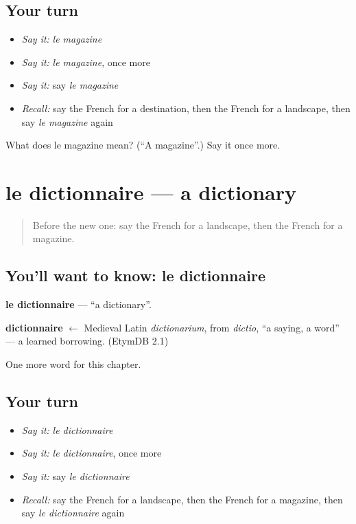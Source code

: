\subsection*{Your turn}
\begin{itemize}
\raggedright
  \item \emph{Say it:} \emph{le magazine}
  \item \emph{Say it:} \emph{le magazine}, once more
  \item \emph{Say it:} say \emph{le magazine}
  \item \emph{Recall:} say the French for a destination, then the French for a landscape, then say \emph{le magazine} again
\end{itemize}

\begin{tcolorbox}[breakable,colback=teal!4,colframe=teal!35!black,title={Before you move on}]
What does le magazine mean? (\textquotedblleft{}A magazine\textquotedblright{}.) Say it once more.
\end{tcolorbox}
\section[le dictionnaire]{le dictionnaire — a dictionary}

\label{lesson:FR-C232-dictionnaire}



\begin{quote}
Before the new one: say the French for a landscape, then the French for a magazine.
\end{quote}

\subsection*{You'll want to know: le dictionnaire}
\textbf{le dictionnaire} — \textquotedblleft{}a dictionary\textquotedblright{}.

\begin{cousinweb}
\textbf{dictionnaire} $\leftarrow$ Medieval Latin \emph{dictionarium}, from \emph{dictio}, \textquotedblleft{}a saying, a word\textquotedblright{} — a learned borrowing. (EtymDB 2.1)
\end{cousinweb}

\begin{grammarlens}[title={What you've built}]
One more word for this chapter.
\end{grammarlens}

\subsection*{Your turn}
\begin{itemize}
\raggedright
  \item \emph{Say it:} \emph{le dictionnaire}
  \item \emph{Say it:} \emph{le dictionnaire}, once more
  \item \emph{Say it:} say \emph{le dictionnaire}
  \item \emph{Recall:} say the French for a landscape, then the French for a magazine, then say \emph{le dictionnaire} again
\end{itemize}

